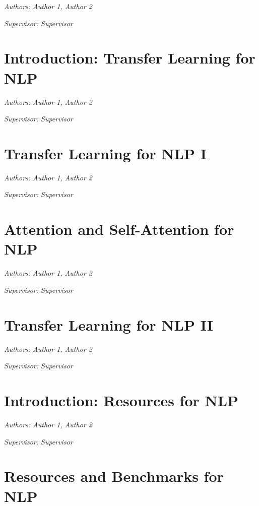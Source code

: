 \documentclass[]{krantz}
\begin{document}
\emph{Authors: Author 1, Author 2}

\emph{Supervisor: Supervisor}

\hypertarget{introduction-transfer-learning-for-nlp}{%
\chapter{Introduction: Transfer Learning for NLP}\label{introduction-transfer-learning-for-nlp}}

\emph{Authors: Author 1, Author 2}

\emph{Supervisor: Supervisor}

\hypertarget{transfer-learning-for-nlp-i}{%
\chapter{Transfer Learning for NLP I}\label{transfer-learning-for-nlp-i}}

\emph{Authors: Author 1, Author 2}

\emph{Supervisor: Supervisor}

\hypertarget{attention-and-self-attention-for-nlp}{%
\chapter{Attention and Self-Attention for NLP}\label{attention-and-self-attention-for-nlp}}

\emph{Authors: Author 1, Author 2}

\emph{Supervisor: Supervisor}

\hypertarget{transfer-learning-for-nlp-ii}{%
\chapter{Transfer Learning for NLP II}\label{transfer-learning-for-nlp-ii}}

\emph{Authors: Author 1, Author 2}

\emph{Supervisor: Supervisor}

\hypertarget{introduction-resources-for-nlp}{%
\chapter{Introduction: Resources for NLP}\label{introduction-resources-for-nlp}}

\emph{Authors: Author 1, Author 2}

\emph{Supervisor: Supervisor}

\hypertarget{resources-and-benchmarks-for-nlp}{%
\chapter{Resources and Benchmarks for NLP}\label{resources-and-benchmarks-for-nlp}}
\end{document}
